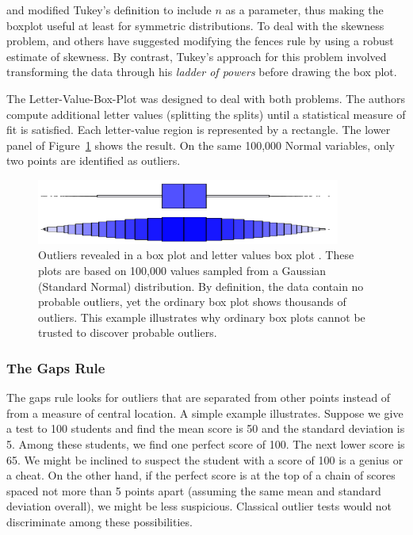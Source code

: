 \documentclass[12pt]{article}
\begin{document}
\cite{HoaglinIglewiczTukey} and \cite{HoaglinIglewicz} modified Tukey's definition to include $n$ as a parameter, thus making the boxplot useful at least for symmetric distributions. To deal with the skewness problem, \cite{HubertVandervieren} and others have suggested modifying the fences rule by using a robust estimate of skewness. By contrast, Tukey's approach for this problem involved transforming the data through his {\it ladder of powers} \cite{EDA} before drawing the box plot.

The Letter-Value-Box-Plot \citep{letter-value-box-plot} was designed to deal with both problems. The authors compute additional letter values (splitting the splits) until a statistical measure of fit is satisfied. Each letter-value region is represented by a rectangle. The lower panel of Figure~\ref{fig:teaser} shows the result. On the same 100,000 Normal variables, only two points are identified as outliers.

\begin{figure}[h]
\centering
\includegraphics[width=10cm]{figures/boxes.pdf}
\caption{ \label{fig:teaser} Outliers revealed in a box plot \citep{EDA} and letter values box plot \citep{letter-value-box-plot}. These plots are based on 100,000 values sampled from a Gaussian (Standard Normal) distribution. By definition, the data contain no probable outliers, yet the ordinary box plot shows thousands of outliers. This example illustrates why ordinary box plots cannot be trusted to discover probable outliers.}
\end{figure}

\subsubsection{The Gaps Rule}
The gaps rule looks for outliers that are separated from other points instead of from a measure of central location. A simple example illustrates. Suppose we give a test to 100 students and find the mean score is 50 and the standard deviation is 5. Among these students, we find one perfect score of 100. The next lower score is 65. We might be inclined to suspect the student with a score of 100 is a genius or a cheat. On the other hand, if the perfect score is at the top of a chain of scores spaced not more than 5 points apart (assuming the same mean and standard deviation overall), we might be less suspicious. Classical outlier tests would not discriminate among these possibilities.
\end{document}
